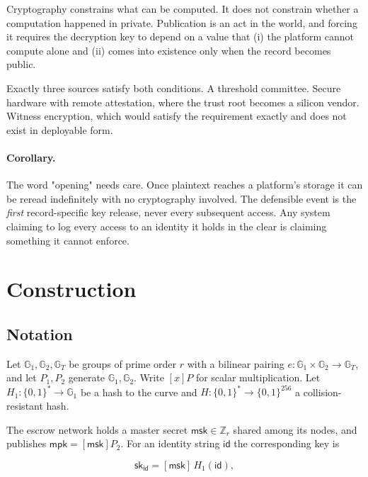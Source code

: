 \documentclass[11pt,a4paper]{article}
\begin{document}
Cryptography constrains what can be computed. It does not constrain whether a
computation happened in private. Publication is an act in the world, and forcing
it requires the decryption key to depend on a value that (i) the platform cannot
compute alone and (ii) comes into existence only when the record becomes public.

Exactly three sources satisfy both conditions. A threshold committee. Secure
hardware with remote attestation, where the trust root becomes a silicon vendor.
Witness encryption, which would satisfy the requirement exactly and does not
exist in deployable form.

\paragraph{Corollary.} The word "opening" needs care. Once plaintext reaches a
platform's storage it can be reread indefinitely with no cryptography involved.
The defensible event is the \emph{first} record-specific key release, never every
subsequent access. Any system claiming to log every access to an identity it
holds in the clear is claiming something it cannot enforce.

\section{Construction}
\label{sec:construction}

\subsection{Notation}

Let $\mathbb{G}_1, \mathbb{G}_2, \mathbb{G}_T$ be groups of prime order $r$ with
a bilinear pairing $e : \mathbb{G}_1 \times \mathbb{G}_2 \to \mathbb{G}_T$, and
let $P_1, P_2$ generate $\mathbb{G}_1, \mathbb{G}_2$. Write $[x]P$ for scalar
multiplication. Let $H_1 : \{0,1\}^* \to \mathbb{G}_1$ be a hash to the curve and
$H : \{0,1\}^* \to \{0,1\}^{256}$ a collision-resistant hash.

The escrow network holds a master secret $\mathsf{msk} \in \mathbb{Z}_r$ shared
among its nodes, and publishes $\mathsf{mpk} = [\mathsf{msk}]P_2$. For an
identity string $\mathsf{id}$ the corresponding key is

\begin{equation}
\mathsf{sk}_{\mathsf{id}} = [\mathsf{msk}]\,H_1(\mathsf{id}),
\label{eq:ibekey}
\end{equation}
\end{document}

